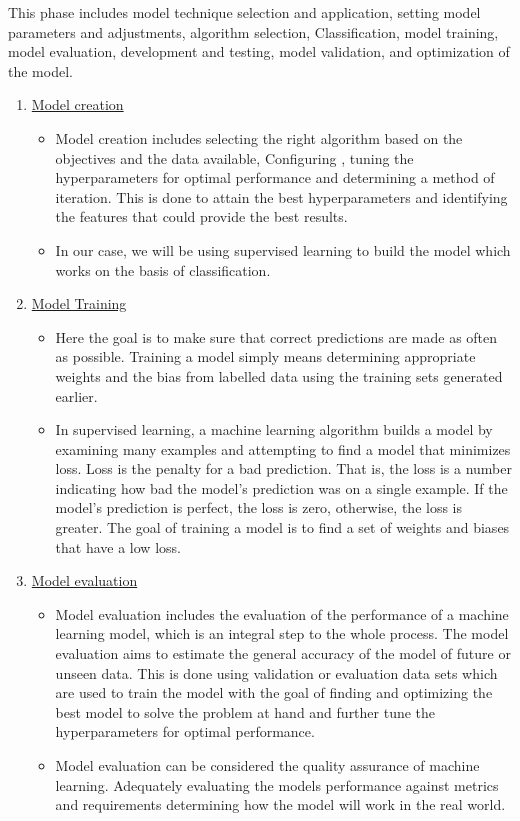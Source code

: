     This phase includes model technique selection and application, setting model parameters and adjustments, algorithm selection, Classification, model training, model evaluation, development and testing, model validation, and optimization of the model.
    \begin{enumerate}
      \item \underline {Model creation}
        \begin{itemize}
          \item Model creation includes selecting the right algorithm based on the objectives and the data available, Configuring , tuning the hyperparameters for optimal performance and determining a method of iteration. This is done to attain the best hyperparameters and identifying the features that could provide the best results.
          \item In our case, we will be using supervised learning to build the model which works on the basis of classification.
        \end{itemize}

      \item \underline {Model Training}
        \begin{itemize}
          \item Here the goal is to make sure that correct predictions are made as often as possible. Training a model simply means determining appropriate weights and the bias from labelled data using the training sets generated earlier.
          \item In supervised learning, a machine learning algorithm builds a model by examining many examples and attempting to find a model that minimizes loss. Loss is the penalty for a bad prediction. That is, the loss is a number indicating how bad the model's prediction was on a single example. If the model's prediction is perfect, the loss is zero, otherwise, the loss is greater. The goal of training a model is to find a set of weights and biases that have a low loss.
        \end{itemize}

      \item \underline {Model evaluation}
        \begin{itemize}
          \item Model evaluation includes the evaluation of the performance of a machine learning model, which is an integral step to the whole process. The model evaluation aims to estimate the general accuracy of the model of future or unseen data. This is done using validation or evaluation data sets which are used to train the model with the goal of finding and optimizing the best model to solve the problem at hand and further tune the hyperparameters for optimal performance.
          \item Model evaluation can be considered the quality assurance of machine learning. Adequately evaluating the models performance against metrics and requirements determining how the model will work in the real world.
        \end{itemize}


\end{enumerate}
